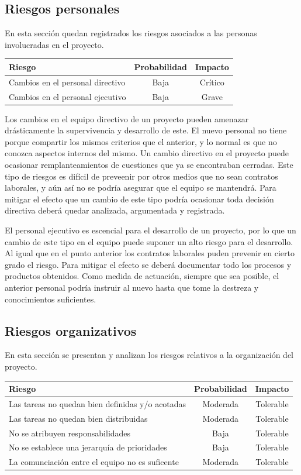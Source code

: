 \subsection{Riesgos personales}
En esta sección quedan registrados los riesgos asociados a las personas involucradas en el proyecto. 

\begin{tabular}{|l|c|c|} \hline
\textbf{Riesgo} & \textbf{Probabilidad} & \textbf{Impacto} \\ \hline
Cambios en el personal directivo & Baja & Crítico \\ \hline
Cambios en el personal ejecutivo & Baja & Grave \\ \hline
\end{tabular}

Los cambios en el equipo directivo de un proyecto pueden amenazar drásticamente la supervivencia y desarrollo de este. 
El nuevo personal no tiene porque compartir los mismos criterios que el anterior, y lo normal es que no conozca aspectos
internos del mismo. Un cambio directivo en el proyecto puede ocasionar remplanteamientos de cuestiones que ya se encontraban cerradas.
Este tipo de riesgos es difícil de preveenir por otros medios que no sean contratos laborales, y aún así no se podría asegurar que el equipo se mantendrá. 
Para mitigar el efecto que un cambio de este tipo podría ocasionar toda decisión directiva deberá quedar analizada, argumentada y registrada. 

El personal ejecutivo es escencial para el desarrollo de un proyecto, por lo que un cambio de este tipo en el equipo puede suponer un alto riesgo 
para el desarrollo. Al igual que en el punto anterior los contratos laborales puden prevenir en cierto grado el riesgo. Para mitigar el efecto se 
deberá documentar todo los procesos y productos obtenidos. Como medida de actuación, siempre que sea posible, el anterior personal podría instruir al
nuevo hasta que tome la destreza y conocimientos suficientes.

\subsection{Riesgos organizativos}

En esta sección se presentan y analizan los riesgos relativos a la organización del proyecto. 

\begin{tabular}{|l|c|c|} \hline
\textbf{Riesgo} & \textbf{Probabilidad} & \textbf{Impacto} \\ \hline
Las tareas no quedan bien definidas y/o acotadas & Moderada & Tolerable \\ \hline
Las tareas no quedan bien distribuidas & Moderada & Tolerable \\ \hline
No se atribuyen responsabilidades & Baja & Tolerable \\ \hline
No se establece una jerarquía de prioridades & Baja & Tolerable \\ \hline
La comunciación entre el equipo no es suficente & Moderada & Tolerable \\ \hline
\end{tabular}

